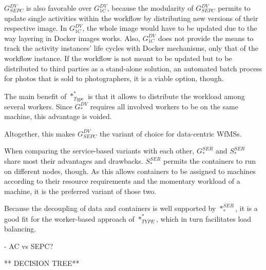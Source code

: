   $G_{SEPC}^{DV}$ is also favorable over $G_{1C}^{DV}$, because the modularity of $G_{SEPC}^{DV}$ permits to update single activities within the workflow by distributing new versions of their respective image. In $G_{1C}^{DV}$, the whole image would have to be updated due to the way layering in Docker images works. Also, $G_{1C}^{DV}$ does not provide the means to track the activity instances' life cycles with Docker mechanisms, only that of the workflow instance. If the workflow is not meant to be updated but to be distributed to third parties as a stand-alone solution, \eg an automated batch process for photos that is sold to photographers, it is a viable option, though.

  The main benefit of $*_{Type}^{*}$ is that it allows to distribute the workload among several workers. Since $G_{*}^{DV}$ requires all involved workers to be on the same machine, this advantage is voided.

  Altogether, this makes $G_{SEPC}^{DV}$ the variant of choice for data-centric \acp{WfMS}.

  When comparing the service-based variants with each other, $G_{*}^{SER}$ and $S_{*}^{SER}$ share most their advantages and drawbacks. $S_{*}^{SER}$ permits the containers to run on different nodes, though. As this allows containers to be assigned to machines according to their resource requirements and the momentary workload of a machine, it is the preferred variant of those two.

  Because the decoupling of data and containers is well supported by $*_{*}^{SER}$, it is a good fit for the worker-based approach of $*_{TYPE}^{*}$, which in turn facilitates load balancing.

    - AC vs SEPC?

  ** DECISION TREE**
